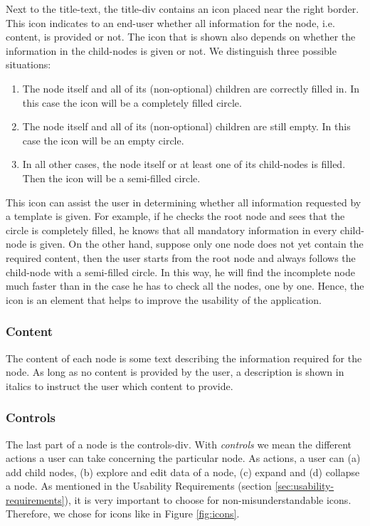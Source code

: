 Next to the title-text, the title-div contains an icon placed near the right border. This icon indicates to an end-user whether all information for the node, i.e. content, is provided or not. The icon that is shown also depends on whether the information in the child-nodes is given or not. We distinguish three possible situations:
\begin{enumerate}
	\item The node itself and all of its (non-optional) children are correctly filled in. In this case the icon will be a completely filled circle.
	\item The node itself and all of its (non-optional) children are still empty. In this case the icon will be an empty circle.
	\item In all other cases, the node itself or at least one of its child-nodes is filled. Then the icon will be a semi-filled circle.
\end{enumerate}
This icon can assist the user in determining whether all information requested by a template is given. For example, if he checks the root node and sees that the circle is completely filled, he knows that all mandatory information in every child-node is given. On the other hand, suppose only one node does not yet contain the required content, then the user starts from the root node and always follows the child-node with a semi-filled circle. In this way, he will find the incomplete node much faster than in the case he has to check all the nodes, one by one. Hence, the icon is an element that helps to improve the usability of the application.



\subsubsection{Content}\label{sec:content}
The content of each node is some text describing the information required for the node. As long as no content is provided by the user, a description is shown in italics to instruct the user which content to provide.



\subsubsection{Controls}\label{sec:controls}
The last part of a node is the controls-div. With \textit{controls} we mean the different actions a user can take concerning the particular node. As actions, a user can (a) add child nodes, (b) explore and edit data of a node, (c) expand and (d) collapse a node. As mentioned in the Usability Requirements (section \ref{sec:usability-requirements}), it is very important to choose for non-misunderstandable icons. Therefore, we chose for icons like in Figure \ref{fig:icons}.\\

